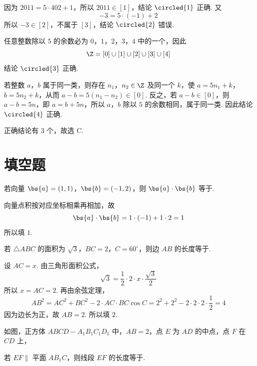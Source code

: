 
\begin{solution}
因为 \(2011=5\cdot402+1\)，所以 \(2011\in[1]\)，结论 \(\circled{1}\) 正确. 又
\[
-3=5\cdot(-1)+2
\]
所以 \(-3\in[2]\)，不属于 \([3]\)，结论 \(\circled{2}\) 错误.

任意整数除以 \(5\) 的余数必为 \(0\)，\(1\)，\(2\)，\(3\)，\(4\) 中的一个，因此
\[
\Z=[0]\cup[1]\cup[2]\cup[3]\cup[4]
\]
结论 \(\circled{3}\) 正确.

若整数 \(a\)，\(b\) 属于同一类，则存在 \(n_1\)，\(n_2\in\Z\) 及同一个 \(k\)，使 \(a=5n_1+k\)，\(b=5n_2+k\)，从而 \(a-b=5(n_1-n_2)\in[0]\). 反之，若 \(a-b\in[0]\)，则 \(a-b=5n\)，即 \(a=b+5n\)，所以 \(a\)，\(b\) 除以 \(5\) 的余数相同，属于同一类. 因此结论 \(\circled{4}\) 正确.

正确结论有 3 个，故选 C.
\end{solution}

\section{填空题}

\begin{problem}
若向量 \(\bs{a}=(1,1)\)，\(\bs{b}=(-1,2)\)，则 \(\bs{a} \cdot \bs{b}\) 等于\fillinblank{}.
\end{problem}


\begin{solution}
向量点积按对应坐标相乘再相加，故
\[
\bs{a}\cdot\bs{b}=1\cdot(-1)+1\cdot2=1
\]
所以填 \(1\).
\end{solution}

\begin{problem}
若 \(\triangle ABC\) 的面积为 \(\sqrt{3}\)，\(BC = 2\)，\(C = 60^{\circ}\)，则边 \(AB\) 的长度等于\fillinblank{}.
\end{problem}


\begin{solution}
设 \(AC=x\). 由三角形面积公式，
\[
\sqrt3=\frac12\cdot2\cdot x\cdot\frac{\sqrt3}{2}
\]
所以 \(x=AC=2\). 再由余弦定理，
\[
AB^2=AC^2+BC^2-2\cdot AC\cdot BC\cos C=2^2+2^2-2\cdot2\cdot2\cdot\frac12=4
\]
因为边长为正，故 \(AB=2\). 所以填 \(2\).
\end{solution}

\begin{problem}
如图，正方体 \(ABCD - A_{1}B_{1}C_{1}D_{1}\) 中，\(AB = 2\)，点 \(E\) 为 \(AD\) 的中点，点 \(F\) 在 \(CD\) 上，

若 \(EF \parallel\) 平面 \(AB_{1}C\)，则线段 \(EF\) 的长度等于\fillinblank{}.

\begin{center}
\end{center}
\end{problem}

